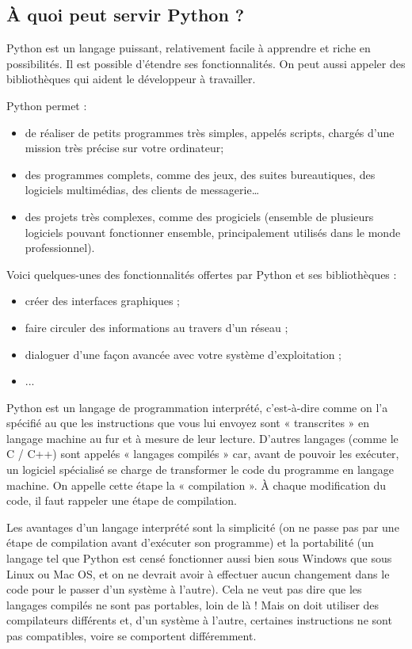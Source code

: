 \subsection{À quoi peut servir Python ?}




Python est un langage puissant, relativement facile à apprendre et riche en possibilités. Il est possible d'étendre ses fonctionnalités. On peut aussi appeler des bibliothèques qui aident le développeur à travailler. 

Python permet :
\begin{itemize}
\item de réaliser de petits programmes très simples, appelés scripts, chargés d'une mission très précise sur votre ordinateur;
\item des programmes complets, comme des jeux, des suites bureautiques, des logiciels multimédias, des clients de messagerie…
\item des projets très complexes, comme des progiciels (ensemble de plusieurs logiciels pouvant fonctionner ensemble, principalement utilisés dans le monde professionnel).
\end{itemize}

Voici quelques-unes des fonctionnalités offertes par Python et ses bibliothèques :
\begin{itemize}
\item créer des interfaces graphiques ;
\item faire circuler des informations au travers d'un réseau ;
\item dialoguer d'une façon avancée avec votre système d'exploitation ;
\item ...
\end{itemize}


Python est un langage de programmation interprété, c'est-à-dire comme on l'a spécifié au que les instructions que vous lui envoyez sont « transcrites » en langage machine au fur et à mesure de leur lecture. D'autres langages (comme le C / C++) sont appelés « langages compilés » car, avant de pouvoir les exécuter, un logiciel spécialisé se charge de transformer le code du programme en langage machine. On appelle cette étape la « compilation ». À chaque modification du code, il faut rappeler une étape de compilation.

Les avantages d'un langage interprété sont la simplicité (on ne passe pas par une étape de compilation avant d'exécuter son programme) et la portabilité (un langage tel que Python est censé fonctionner aussi bien sous Windows que sous Linux ou Mac OS, et on ne devrait avoir à effectuer aucun changement dans le code pour le passer d'un système à l'autre). Cela ne veut pas dire que les langages compilés ne sont pas portables, loin de là ! Mais on doit utiliser des compilateurs différents et, d'un système à l'autre, certaines instructions ne sont pas compatibles, voire se comportent différemment.

